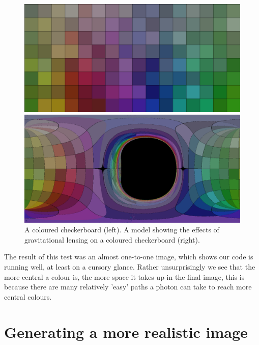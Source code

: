 \documentclass[oneside,openright,frontopenright, singlespacing]{dmathesis}
\begin{document}
\vspace{1em}
\begin{figure}[!ht]
	\centering
	\begin{minipage}{0.5\textwidth}
		\centering
		\includegraphics[width=0.95\linewidth]{img/checkerboard-own}
	\end{minipage}%
	\hfill
	\begin{minipage}{0.5\textwidth}
		\centering
		\includegraphics[width=0.95\linewidth]{img/checkerboard-own-kerr}
	\end{minipage}
	\caption{A coloured checkerboard (left). A model showing the effects of gravitational lensing on a coloured checkerboard (right).}
	\label{fig:Figure4.4}
\end{figure}

\vspace{1em}
	The result of this test was an almost one-to-one image, which shows our code is running well, at least on a cursory glance. Rather unsurprisingly we see that the more central a colour is, the more space it takes up in the final image, this is because there are many relatively 'easy' paths a photon can take to reach more central colours.





\chapter{Generating a more realistic image}\label{chap:Chapter5}
\end{document}
